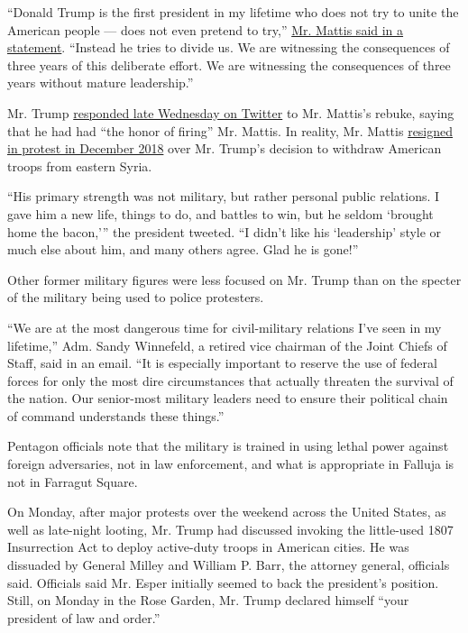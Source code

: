 ``Donald Trump is the first president in my lifetime who does not try to
unite the American people --- does not even pretend to try,''
\href{https://int.nyt.com/data/documenthelper/6991-mattis-statement/5ce1ea06ba0f4fc8eeb3/optimized/full.pdf\#page=1}{Mr.
Mattis said in a statement}. ``Instead he tries to divide us. We are
witnessing the consequences of three years of this deliberate effort. We
are witnessing the consequences of three years without mature
leadership.''

Mr. Trump
\href{https://twitter.com/realDonaldTrump/status/1268347256748507136?s=20}{responded
late Wednesday on Twitter} to Mr. Mattis's rebuke, saying that he had
had ``the honor of firing'' Mr. Mattis. In reality, Mr. Mattis
\href{https://www.nytimes.com/2018/12/20/us/politics/jim-mattis-defense-secretary-trump.html}{resigned
in protest in December 2018} over Mr. Trump's decision to withdraw
American troops from eastern Syria.

``His primary strength was not military, but rather personal public
relations. I gave him a new life, things to do, and battles to win, but
he seldom `brought home the bacon,''' the president tweeted. ``I didn't
like his `leadership' style or much else about him, and many others
agree. Glad he is gone!''

Other former military figures were less focused on Mr. Trump than on the
specter of the military being used to police protesters.

``We are at the most dangerous time for civil-military relations I've
seen in my lifetime,'' Adm. Sandy Winnefeld, a retired vice chairman of
the Joint Chiefs of Staff, said in an email. ``It is especially
important to reserve the use of federal forces for only the most dire
circumstances that actually threaten the survival of the nation. Our
senior-most military leaders need to ensure their political chain of
command understands these things.''

Pentagon officials note that the military is trained in using lethal
power against foreign adversaries, not in law enforcement, and what is
appropriate in Falluja is not in Farragut Square.

On Monday, after major protests over the weekend across the United
States, as well as late-night looting, Mr. Trump had discussed invoking
the little-used 1807 Insurrection Act to deploy active-duty troops in
American cities. He was dissuaded by General Milley and William P. Barr,
the attorney general, officials said. Officials said Mr. Esper initially
seemed to back the president's position. Still, on Monday in the Rose
Garden, Mr. Trump declared himself ``your president of law and order.''

